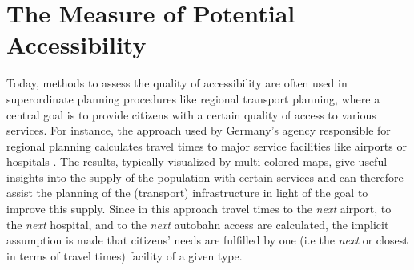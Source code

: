 \section{The Measure of Potential Accessibility}
\label{sec:potential}
Today, methods to assess the quality of accessibility are often used in superordinate planning procedures like 
regional transport planning, where a central goal is to provide 
citizens with a certain quality of access to various services. For instance, the approach used by Germany's agency 
responsible for regional planning calculates travel times to major service facilities like airports or hospitals \citep{BBSR20xxErreichbarkeitsmodell}. The results, typically visualized by multi-colored maps, give useful insights 
into the supply of the population with certain services and can therefore assist the planning of the (transport) 
infrastructure in light of the goal to improve this supply.
Since in this approach travel times to the \textit{next} airport, to the \textit{next} hospital, and to the \textit{next} 
autobahn access are calculated, the implicit assumption is made that citizens' needs are fulfilled by one (i.e the \textit{next} 
or closest in terms of travel times) facility of a given type.


